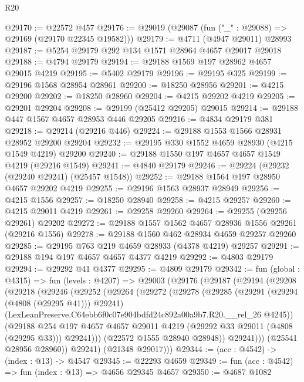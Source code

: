 \begin{lexlean}{R20}
\begin{coremodule}
@29170 := @22572 @457
@29176 := @29019 (@29087 (fun ("_" : @29088) => @29169 (@29170 @22345 @19582)))
@29179 := @4711 (@4947 @29011) @28993
@29187 := @5254 @29179 @292 @134 @1571 @28964 @4657 @29017 @29018
@29188 := @4794 @29179
@29194 := @29188 @1569 @197 @28962 @4657 @29015 @4219
@29195 := @5402 @29179
@29196 := @29195 @325
@29199 := @29196 @1568 @28954 @28961
@29200 := @18250 @28956
@29201 := @4215 @29200
@29202 := @18250 @28960
@29204 := @4215 @29202 @4219
@29205 := @29201 @29204
@29208 := @29199 (@25412 @29205) @29015
@29214 := @29188 @447 @1567 @4657 @28953 @446 @29205
@29216 := @4834 @29179 @381
@29218 := @29214 (@29216 @446)
@29224 := @29188 @1553 @1566 @28931 @28952 @29200 @29204
@29232 := @29195 @330 @1552 @4659 @28930 (@4215 @1549 @4219) @29200
@29240 := @29188 @1550 @197 @4657 @4657 @1549 @4219 (@29216 @1549)
@29241 := @4840 @29179
@29246 := @29224 (@29232 (@29240 @29241) (@25457 @1548))
@29252 := @29188 @1564 @197 @28950 @4657 @29202 @4219
@29255 := @29196 @1563 @28937 @28949
@29256 := @4215 @1556
@29257 := @18250 @28940
@29258 := @4215 @29257
@29260 := @4215 @29011 @4219
@29261 := @29258 @29260
@29264 := @29255 (@29256 @29261) @29202
@29272 := @29188 @1557 @1562 @4657 @28936 @1556 @29261 (@29216 @1556)
@29278 := @29188 @1560 @462 @28934 @4659 @29257 @29260
@29285 := @29195 @763 @219 @4659 @28933 (@4378 @4219) @29257
@29291 := @29188 @194 @197 @4657 @4657 @4377 @4219
@29292 := @4803 @29179
@29294 := @29292 @41 @4377
@29295 := @4809 @29179
@29342 := fun (global : @4315) =>
  fun (levels : @4207) =>
  @29003
    (@29176
      (@29187
        (@29194
          (@29208
            (@29218
              (@29246
                (@29252
                  (@29264
                    (@29272
                      (@29278
                        (@29285
                          (@29291 (@29294 (@4808 (@29295 @41))) @29241)
                          (LexLeanPreserve.C64ebb6f0c07e904bdfd24c892a00a9b7.R20.__rel_26 @4245))
                        (@29188
                          @254
                          @197
                          @4657
                          @4657
                          @29011
                          @4219
                          (@29292 @33 @29011 (@4808 (@29295 @33)))
                          @29241)))
                    (@22572 @1555 @28940 @28948))
                  @29241)))
            (@25541 @28956 @28960))
          @29241)
        (@21348 @29017)))
@29344 := (acc : @4542) -> (index : @13) -> @4547
@29345 := @22293 @4659
@29349 := fun (acc : @4542) => fun (index : @13) => @4656 @29345 @4657
@29350 := @4687 @1082

\end{coremodule}
\end{lexlean}
